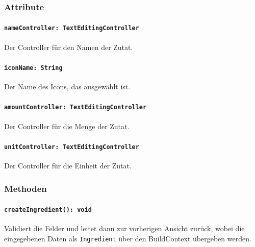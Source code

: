 \documentclass{entwurfsheft}
\begin{document}
\subsubsection*{Attribute}
\paragraph{\texttt{nameController: TextEditingController}}
Der Controller für den Namen der Zutat.
\paragraph{\texttt{iconName: String}}
Der Name des Icons, das ausgewählt ist.
\paragraph{\texttt{amountController: TextEditingController}}
Der Controller für die Menge der Zutat.
\paragraph{\texttt{unitController: TextEditingController}}
Der Controller für die Einheit der Zutat.
\subsubsection*{Methoden}
\paragraph{\texttt{createIngredient(): void}}
Validiert die Felder und leitet dann zur vorherigen Ansicht zurück, wobei die eingegebenen Daten als \texttt{Ingredient} über den \Gls{BuildContext} übergeben werden.
\newpage
\end{document}
